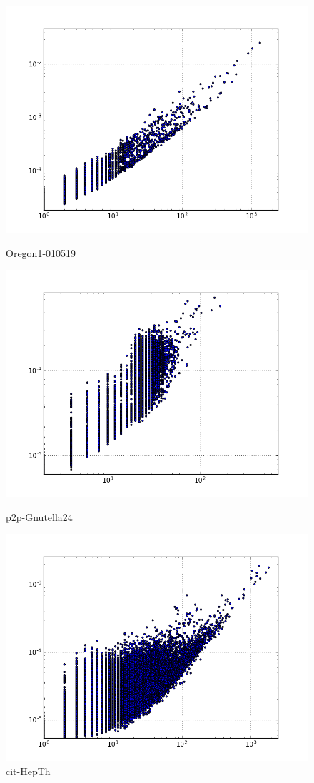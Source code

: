 \begin{figure}[H]
  \includegraphics[width=\linewidth]{img/oregon-010519/degreeVSpagerank.png}
  \caption*{Oregon1-010519}
\endminipage\hfill
{}
  \includegraphics[width=\linewidth]{img/p2p-Gnutella24/degreeVSpagerank.png}
  \caption*{p2p-Gnutella24}
\endminipage\hfill
{}
  \includegraphics[width=\linewidth]{img/cit-HepTh/degreeVSpagerank.png}
  \caption*{cit-HepTh}
\endminipage
\end{figure}

